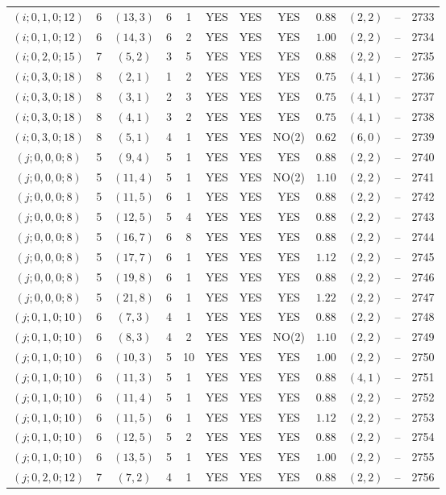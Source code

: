 \begin{longtable}{|c|c|c|c|c|c|c|c|c|c|c|c|}
$(i;0,1,0;12)$ & 6 & $(13,3)$ & 6 & 1 & YES & YES & YES & $0.88$ & $(2,2)$ & -- & 2733\\
$(i;0,1,0;12)$ & 6 & $(14,3)$ & 6 & 2 & YES & YES & YES & $1.00$ & $(2,2)$ & -- & 2734\\
$(i;0,2,0;15)$ & 7 & $(5,2)$ & 3 & 5 & YES & YES & YES & $0.88$ & $(2,2)$ & -- & 2735\\
$(i;0,3,0;18)$ & 8 & $(2,1)$ & 1 & 2 & YES & YES & YES & $0.75$ & $(4,1)$ & -- & 2736\\
$(i;0,3,0;18)$ & 8 & $(3,1)$ & 2 & 3 & YES & YES & YES & $0.75$ & $(4,1)$ & -- & 2737\\
$(i;0,3,0;18)$ & 8 & $(4,1)$ & 3 & 2 & YES & YES & YES & $0.75$ & $(4,1)$ & -- & 2738\\
$(i;0,3,0;18)$ & 8 & $(5,1)$ & 4 & 1 & YES & YES & NO(2) & $0.62$ & $(6,0)$ & -- & 2739\\
$(j;0,0,0;8)$ & 5 & $(9,4)$ & 5 & 1 & YES & YES & YES & $0.88$ & $(2,2)$ & -- & 2740\\
$(j;0,0,0;8)$ & 5 & $(11,4)$ & 5 & 1 & YES & YES & NO(2) & $1.10$ & $(2,2)$ & -- & 2741\\
$(j;0,0,0;8)$ & 5 & $(11,5)$ & 6 & 1 & YES & YES & YES & $0.88$ & $(2,2)$ & -- & 2742\\
$(j;0,0,0;8)$ & 5 & $(12,5)$ & 5 & 4 & YES & YES & YES & $0.88$ & $(2,2)$ & -- & 2743\\
$(j;0,0,0;8)$ & 5 & $(16,7)$ & 6 & 8 & YES & YES & YES & $0.88$ & $(2,2)$ & -- & 2744\\
$(j;0,0,0;8)$ & 5 & $(17,7)$ & 6 & 1 & YES & YES & YES & $1.12$ & $(2,2)$ & -- & 2745\\
$(j;0,0,0;8)$ & 5 & $(19,8)$ & 6 & 1 & YES & YES & YES & $0.88$ & $(2,2)$ & -- & 2746\\
$(j;0,0,0;8)$ & 5 & $(21,8)$ & 6 & 1 & YES & YES & YES & $1.22$ & $(2,2)$ & -- & 2747\\
$(j;0,1,0;10)$ & 6 & $(7,3)$ & 4 & 1 & YES & YES & YES & $0.88$ & $(2,2)$ & -- & 2748\\
$(j;0,1,0;10)$ & 6 & $(8,3)$ & 4 & 2 & YES & YES & NO(2) & $1.10$ & $(2,2)$ & -- & 2749\\
$(j;0,1,0;10)$ & 6 & $(10,3)$ & 5 & 10 & YES & YES & YES & $1.00$ & $(2,2)$ & -- & 2750\\
$(j;0,1,0;10)$ & 6 & $(11,3)$ & 5 & 1 & YES & YES & YES & $0.88$ & $(4,1)$ & -- & 2751\\
$(j;0,1,0;10)$ & 6 & $(11,4)$ & 5 & 1 & YES & YES & YES & $0.88$ & $(2,2)$ & -- & 2752\\
$(j;0,1,0;10)$ & 6 & $(11,5)$ & 6 & 1 & YES & YES & YES & $1.12$ & $(2,2)$ & -- & 2753\\
$(j;0,1,0;10)$ & 6 & $(12,5)$ & 5 & 2 & YES & YES & YES & $0.88$ & $(2,2)$ & -- & 2754\\
$(j;0,1,0;10)$ & 6 & $(13,5)$ & 5 & 1 & YES & YES & YES & $1.00$ & $(2,2)$ & -- & 2755\\
$(j;0,2,0;12)$ & 7 & $(7,2)$ & 4 & 1 & YES & YES & YES & $0.88$ & $(2,2)$ & -- & 2756
\end{longtable}
